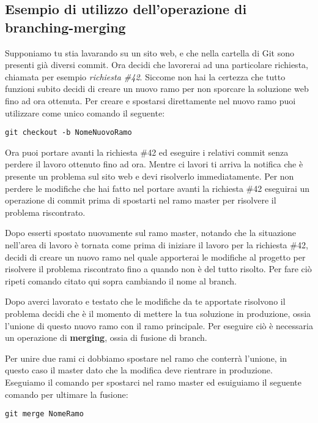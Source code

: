 \subsection{Esempio di utilizzo dell'operazione di branching-merging}
Supponiamo tu stia lavarando su un sito web, e che nella cartella di Git sono presenti già diversi commit. Ora decidi che lavorerai ad una particolare richiesta, chiamata per esempio \textit{richiesta \#42}. Siccome non hai la certezza che tutto funzioni subito decidi di creare un nuovo ramo per non sporcare la soluzione web fino ad ora ottenuta. Per creare e spostarsi direttamente nel nuovo ramo puoi utilizzare come unico comando il seguente:

\begin{center}
\texttt{git checkout -b NomeNuovoRamo}
\end{center}

Ora puoi portare avanti la richiesta \#42 ed eseguire i relativi commit senza perdere il lavoro ottenuto fino ad ora. Mentre ci lavori ti arriva la notifica che è presente un problema sul sito web e devi risolverlo immediatamente. Per non perdere le modifiche che hai fatto nel portare avanti la richiesta \#42 eseguirai un operazione di commit prima di spostarti nel ramo master per risolvere il problema riscontrato.

Dopo esserti spostato nuovamente sul ramo master, notando che la situazione nell'area di lavoro è tornata come prima di iniziare il lavoro per la richiesta \#42, decidi di creare un nuovo ramo nel quale apporterai le modifiche al progetto per risolvere il problema riscontrato fino a quando non è del tutto risolto. Per fare ciò ripeti comando citato qui sopra cambiando il nome al branch.

Dopo averci lavorato e testato che le modifiche da te apportate risolvono il problema decidi che è il momento di mettere la tua soluzione in produzione, ossia l'unione di questo nuovo ramo con il ramo principale. Per eseguire ciò è necessaria un operazione di \textbf{merging}, ossia di fusione di branch.

Per unire due rami ci dobbiamo spostare nel ramo che conterrà l'unione, in questo caso il master dato che la modifica deve rientrare in produzione. Eseguiamo il comando per spostarci nel ramo master ed esuiguiamo il seguente comando per ultimare la fusione:

\begin{center}
\texttt{git merge NomeRamo}
\end{center}

